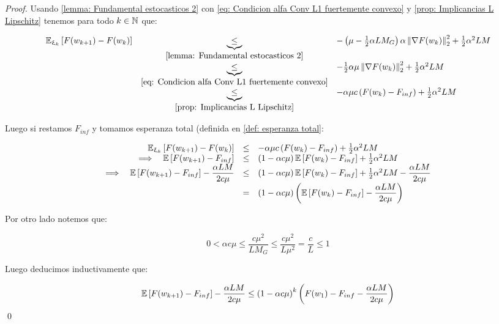\begin{proof}
	Usando \ref{lemma: Fundamental estocasticos 2} con \ref{eq: Condicion alfa Conv L1 fuertemente convexo} y \ref{prop: Implicancias L Lipschitz} tenemos para todo $k \in {\mathbb{N}}$ que:
	
	\begin{equation*}
	\begin{array}{rcl}
		\mathbb{E}_{\upxi_{k}} \left[F(w_{k+1}) - F(w_k)\right] & \underbrace{\leq}_{\ref{lemma: Fundamental estocasticos 2}} & - \left( \mu - \frac{1}{2} \alpha L M_G \right)\alpha \left\lVert\nabla F(w_k)\right\rVert_2^2 + \frac{1}{2} \alpha^2 L M \\
		& \underbrace{\leq}_{\ref{eq: Condicion alfa Conv L1 fuertemente convexo}} & - \frac{1}{2} \alpha \mu \left\lVert\nabla F(w_k)\right\rVert_2^2 + \frac{1}{2} \alpha ^2 LM \\
		& \underbrace{\leq}_{\ref{prop: Implicancias L Lipschitz}} & - \alpha \mu c \left(F(w_k) - F_{inf} \right)+ \frac{1}{2} \alpha ^2 LM 
	\end{array}
	\end{equation*}
	
	Luego si restamos $F_{inf}$ y tomamos esperanza total (definida en \ref{def: esperanza total}:
	
		\begin{equation*}
	\begin{array}{rcl}
	\mathbb{E}_{\upxi_{k}} \left[F(w_{k+1}) - F(w_k)\right] & \leq & - \alpha \mu c \left(F(w_k) - F_{inf} \right)+ \frac{1}{2} \alpha ^2 LM  \\
	\Longrightarrow \quad \mathbb{E} \left[F(w_{k+1}) - F_{inf}\right] & \leq & \left(1 - \alpha c \mu  \right) \mathbb{E} \left[F(w_k) - F_{inf}\right] +   \frac{1}{2} \alpha ^2 LM  \\
	\Longrightarrow \quad \mathbb{E} \left[F(w_{k+1}) - F_{inf}\right] - \dfrac{\alpha L M}{2 c \mu } & \leq & \left(1 - \alpha c \mu  \right) \mathbb{E} \left[F(w_k) - F_{inf}\right] +   \frac{1}{2} \alpha ^2 LM  - \dfrac{\alpha L M}{2 c \mu } \\
	& = &  \left(1 - \alpha c \mu  \right)  \left(\mathbb{E} \left[F(w_k) - F_{inf}\right]  -  \dfrac{\alpha L M}{2 c \mu }  \right)
	\end{array}
	\end{equation*}
	
	Por otro lado notemos que:
	
	\begin{equation*}
	 0 < \alpha c \mu \leq \dfrac{c \mu^2}{L M_G} \leq \dfrac{c \mu ^2}{L \mu ^2} = \frac{c}{L} \leq 1
	\end{equation*}
	
	Luego deducimos inductivamente que:
	
	\begin{equation*}
		\mathbb{E} \left[F(w_{k+1}) - F_{inf}\right] - \dfrac{\alpha L M}{2 c \mu } \leq \left(1 - \alpha c \mu \right)^{k} \left(F(w_1) - F_{inf} - \dfrac{\alpha LM}{2 c \mu} \right)
	\end{equation*}
	\qed
\end{proof}

